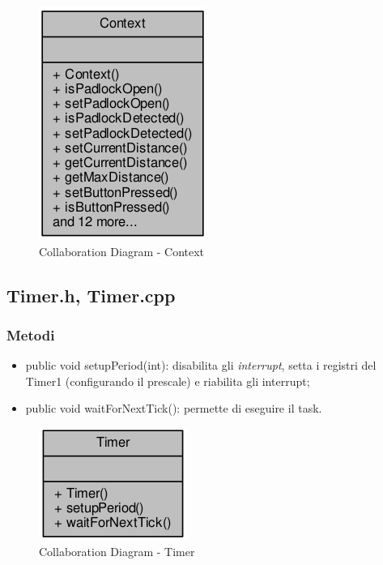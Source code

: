 \begin{figure}[!ht]
	\centering
	\includegraphics[scale=.5]{img/UML/CollaborationDiagram/Context.png}
	\caption{Collaboration Diagram - Context}
\end{figure}

\subsection{Timer.h, Timer.cpp}
\subsubsection{Metodi}
\begin{itemize}
	\item public void setupPeriod(int): disabilita gli \textit{interrupt}, setta i registri del Timer1 (configurando il prescale) e riabilita gli interrupt;
	\item public void waitForNextTick(): permette di eseguire il task.
\end{itemize}
\begin{figure}[!ht]
	\centering
	\includegraphics[scale=.5]{img/UML/CollaborationDiagram/Timer.png}
	\caption{Collaboration Diagram - Timer}
\end{figure}
